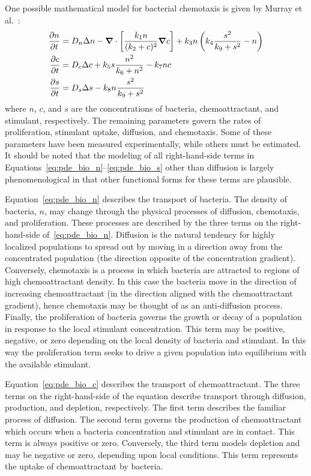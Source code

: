 One possible mathematical model for bacterial chemotaxis is given by Murray et al.~\cite{spatial_patters_in_bio}:
\begin{align}
  \label{eq:pde_bio_n}
  {\frac{\partial{n}}{\partial{t}}} & = D_n \Delta n - {\boldsymbol{\nabla}} {} \cdot \left[ \frac{k_1 n}{(k_2 + c)^2} {\boldsymbol{\nabla}} {c} \right]
                                    + k_3 n \left( k_4 \frac{s^2}{k_9 + s^2} - n \right) \\
  \label{eq:pde_bio_c}
  {\frac{\partial{c}}{\partial{t}}} & = D_c \Delta c + k_5 s \frac{n^2}{k_6 + n^2} - k_7 nc \\
  \label{eq:pde_bio_s}
  {\frac{\partial{s}}{\partial{t}}} & = D_s \Delta s - k_8 n \frac{s^2}{k_9 + s^2}
\end{align}
where $n$, $c$, and $s$ are the concentrations of bacteria, chemoattractant, and stimulant, respectively.  The remaining parameters govern the rates of proliferation, stimulant uptake, diffusion, and chemotaxis.  Some of these parameters have been measured experimentally, while others must be estimated. It should  be noted that the modeling of all right-hand-side terms in Equations~\eqref{eq:pde_bio_n}--\eqref{eq:pde_bio_s} other than diffusion is largely phenomenological in that other functional forms for these terms are plausible.  

Equation~\eqref{eq:pde_bio_n} describes the transport of bacteria.  The density of bacteria, $n$, may change through the physical processes of diffusion, chemotaxis, and proliferation.  These processes are described by the three terms on the right-hand-side of~\eqref{eq:pde_bio_n}.  Diffusion is the natural tendency for highly localized populations to spread out by moving in a direction away from the concentrated population (the direction opposite of the concentration gradient).  Conversely, chemotaxis is a process in which bacteria are attracted to regions of high chemoattractant density. In this case the bacteria move in the direction of increasing chemoattractant  (in the direction aligned with the chemoattractant gradient), hence chemotaxis may be thought of as an anti-diffusion process.  Finally, the proliferation of bacteria governs the growth or decay of a population in response to the local stimulant concentration. This term may be positive, negative, or zero depending on the local density of bacteria and stimulant.  In this way the proliferation term seeks to drive a given population into equilibrium with the available stimulant.

Equation~\eqref{eq:pde_bio_c} describes the transport of chemoattractant.  The three terms on the right-hand-side of the equation describe transport through diffusion, production, and depletion, respectively. The first term describes the familiar process of diffusion. The second term governs the production of chemoattractant which occurs when a bacteria concentration and stimulant are in contact.  This term is always positive or zero.  Conversely, the third term models depletion and may be negative or zero, depending upon local conditions.  This term represents the uptake of chemoattractant by bacteria.

